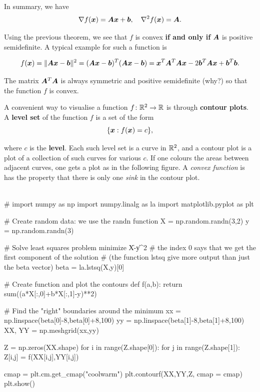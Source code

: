 \begin{example}
 In summary, we have
 \begin{equation*}
   \nabla f(\bm{x}) = \bm{A}\bm{x} + \bm{b}, \quad \nabla^2f(\bm{x}) = \bm{A}.
 \end{equation*}
 
 Using the previous theorem, we see that $f$ is convex \textbf{if and only if} $\bm{A}$ is positive semidefinite. A typical example for such a function is
 
 \begin{equation*}
   f(\bm{x}) = \|\bm{A}\bm{x}-\bm{b}\|^2 = (\bm{A}\bm{x}-\bm{b})^{T}(\bm{A}\bm{x}-\bm{b}) = \bm{x}^{T}\bm{A}^{T}\bm{A}\bm{x} -2\bm{b}^{T}\bm{A}\bm{x}+\bm{b}^T\bm{b}.
 \end{equation*}
 
 The matrix $\bm{A}^T\bm{A}$ is always symmetric and positive semidefinite (why?) so that the function $f$ is convex.
\end{example}

A convenient way to visualise a function $f\colon \mathbb{R}^2\to \mathbb{R}$ is through \textbf{contour plots}. A \textbf{level set} of the function $f$ is a set of the form
\begin{equation*}
  \{\bm{x}\mathrel{\mathop{:}} f(\bm{x}) = c\},
\end{equation*}

where $c$ is the \textbf{level}. Each such level set is a curve in $\mathbb{R}^2$, and a contour plot is a plot of a collection of such curves for various $c$. If one colours the areas between adjacent curves, one gets a plot as in the following figure. A {\em convex function} is has the property that there is only one {\em sink} in the contour plot.

\begin{ipythonnb}
\\# import numpy as np
import numpy.linalg as la
import matplotlib.pyplot as plt

# Create random data: we use the randn function
X = np.random.randn(3,2)
y = np.random.randn(3)

# Solve least squares problem minimize \|X\beta-y\|^2
# the index 0 says that we get the first component of the solution
# (the function lstsq give more output than just the beta vector)
beta = la.lstsq(X,y)[0]

# Create function and plot the contours
def f(a,b):
    return sum((a*X[:,0]+b*X[:,1]-y)**2)

# Find the "right" boundaries around the minimum
xx = np.linspace(beta[0]-8,beta[0]+8,100)
yy = np.linspace(beta[1]-8,beta[1]+8,100)
XX, YY = np.meshgrid(xx,yy)

Z = np.zeros(XX.shape)
for i in range(Z.shape[0]):
    for j in range(Z.shape[1]):
        Z[i,j] = f(XX[i,j],YY[i,j])

cmap = plt.cm.get_cmap("coolwarm")
plt.contourf(XX,YY,Z, cmap = cmap)
plt.show()
\end{ipythonnb}

